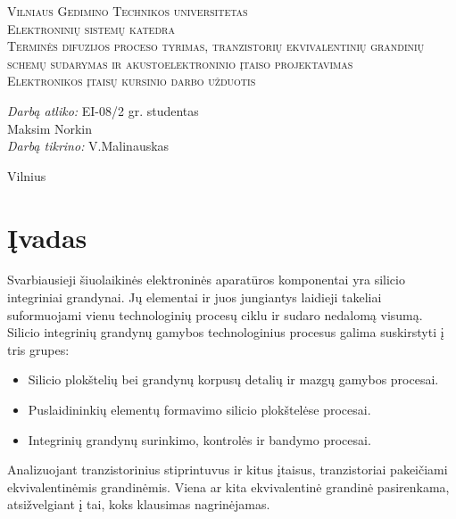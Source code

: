 \documentclass[11pt,a4paper]{article}
\begin{document}
\begin{titlepage}
  
  \begin{center}
    \textsc{\LARGE Vilniaus Gedimino Technikos universitetas}\\[2mm]
    \textsc{\Large Elektroninių sistemų katedra}\\[70mm]
    \textsc{\Large Terminės difuzijos proceso tyrimas, tranzistorių ekvivalentinių grandinių schemų sudarymas ir akustoelektroninio įtaiso projektavimas}\\[10mm]
    \textsc{\normalsize Elektronikos įtaisų kursinio darbo užduotis}\\[40mm]
    \begin{minipage}{1\textwidth}
      \begin{flushright}
        \emph{Darbą atliko:} EI-08/2 gr. studentas\\ Maksim Norkin\\
        \emph{Darbą tikrino:} V.Malinauskas\\
      \end{flushright}
    \end{minipage}
    \vfill
    {\large Vilnius \\ \the\year}
  \end{center}
\end{titlepage}
\tableofcontents
\newpage
\section{Įvadas}

Svarbiausieji šiuolaikinės elektroninės aparatūros komponentai yra silicio integriniai grandynai. Jų elementai 
ir juos jungiantys laidieji takeliai suformuojami vienu technologinių procesų ciklu ir sudaro nedalomą visumą.\\

Silicio integrinių grandynų gamybos technologinius procesus galima suskirstyti į tris grupes:
\begin{itemize}
	\item Silicio plokštelių bei grandynų korpusų detalių ir mazgų gamybos procesai.
	\item Puslaidininkių elementų formavimo silicio plokštelėse procesai.
	\item Integrinių grandynų surinkimo, kontrolės ir bandymo procesai.
\end{itemize}

Analizuojant tranzistorinius stiprintuvus ir kitus įtaisus, tranzistoriai pakeičiami ekvivalentinėmis grandinėmis. 
Viena ar kita ekvivalentinė grandinė pasirenkama, atsižvelgiant į tai, koks klausimas nagrinėjamas.\\
\end{document}
